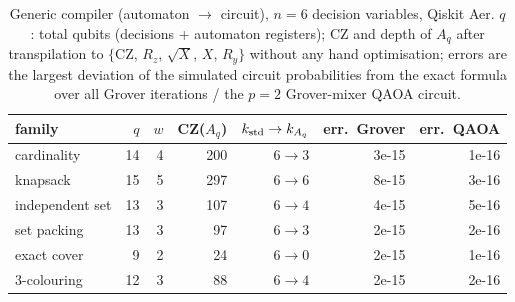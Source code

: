 \begin{table}[t]\centering\small
\caption{ Generic compiler (automaton $\to$ circuit), $n=6$ decision variables, Qiskit Aer. $q$: total qubits (decisions + automaton registers); CZ and depth of $A_q$ after transpilation to $\{$CZ, $R_z$, $\sqrt X$, $X$, $R_y\}$ without any hand optimisation; errors are the largest deviation of the simulated circuit probabilities from the exact formula over all Grover iterations / the $p{=}2$ Grover-mixer QAOA circuit.}\label{tab:gen_circ}
\begin{tabular}{lrrrrrr}\toprule
family & $q$ & $w$ & CZ($A_q$) & $k_{\rm std}\to k_{A_q}$ & err.\ Grover & err.\ QAOA\\\midrule
cardinality & 14 & 4 & 200 & $6\to3$ & 3e-15 & 1e-16\\
knapsack & 15 & 5 & 297 & $6\to6$ & 8e-15 & 3e-16\\
independent set & 13 & 3 & 107 & $6\to4$ & 4e-15 & 5e-16\\
set packing & 13 & 3 & 97 & $6\to3$ & 2e-15 & 2e-16\\
exact cover & 9 & 2 & 24 & $6\to0$ & 2e-15 & 1e-16\\
3-colouring & 12 & 3 & 88 & $6\to4$ & 2e-15 & 2e-16\\
\bottomrule\end{tabular}\end{table}
